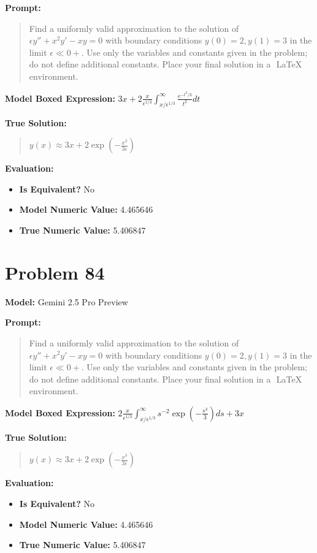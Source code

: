 \documentclass{article}
\begin{document}
{\textbf{Prompt:}
\begin{quote}
Find a uniformly valid approximation to the solution of $\epsilon y'' + x^2y' - xy = 0$ with boundary conditions $y(0) = 2, y(1) = 3$ in the limit $\epsilon \ll 0+$. Use only the variables and constants given in the problem; do not define additional constants. Place your final solution in a $\boxed{}$ LaTeX environment.
\end{quote}
\textbf{Model Boxed Expression:} $3x + 2\frac{x}{\epsilon^{1/3}}\int_{x/\epsilon^{1/3}}^{\infty} \frac{e^{-t^3/3}}{t^2}dt$

\textbf{True Solution:}
\begin{quote}
$y(x) \approx 3x + 2 \exp\left(-\frac{x^3}{3\epsilon}\right)$
\end{quote}

\textbf{Evaluation:}
\begin{itemize}
\item \textbf{Is Equivalent?} No
\item \textbf{Model Numeric Value:} 4.465646
\item \textbf{True Numeric Value:} 5.406847
\end{itemize}
\vspace{1cm}
\section*{Problem 84}
\textbf{Model:} Gemini 2.5 Pro Preview

\textbf{Prompt:}
\begin{quote}
Find a uniformly valid approximation to the solution of $\epsilon y'' + x^2y' - xy = 0$ with boundary conditions $y(0) = 2, y(1) = 3$ in the limit $\epsilon \ll 0+$. Use only the variables and constants given in the problem; do not define additional constants. Place your final solution in a $\boxed{}$ LaTeX environment.
\end{quote}
\textbf{Model Boxed Expression:} $2 \frac{x}{\epsilon^{1/3}} \int_{x/\epsilon^{1/3}}^{\infty} s^{-2} \exp\left(-\frac{s^3}{3}\right) ds + 3x$

\textbf{True Solution:}
\begin{quote}
$y(x) \approx 3x + 2 \exp\left(-\frac{x^3}{3\epsilon}\right)$
\end{quote}

\textbf{Evaluation:}
\begin{itemize}
\item \textbf{Is Equivalent?} No
\item \textbf{Model Numeric Value:} 4.465646
\item \textbf{True Numeric Value:} 5.406847
\end{itemize}
\vspace{1cm}
}
\end{document}
